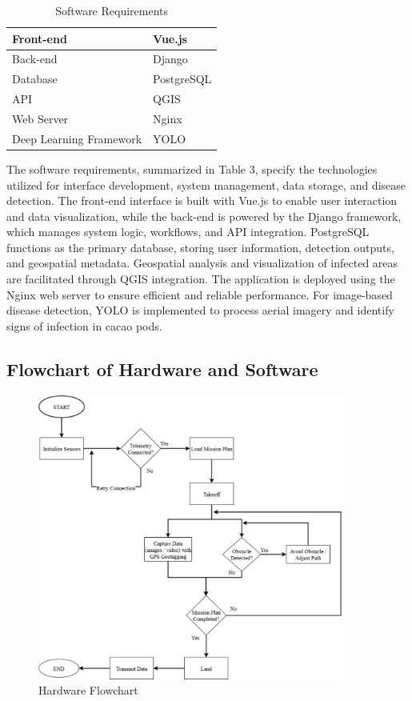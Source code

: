 \begin{table}[H]
	\centering
	\caption{Software Requirements}
	\label{tab:softreq}
	\begin{tabular}{ll}
		\toprule
		Front-end               & Vue.js     \\
		\midrule
		Back-end                & Django     \\
		\midrule
		Database                & PostgreSQL \\
		\midrule
		API                     & QGIS       \\
		\midrule
		Web Server              & Nginx      \\
		\midrule
		Deep Learning Framework & YOLO       \\
		\bottomrule
	\end{tabular}
\end{table}

The software requirements, summarized in Table 3, specify the technologies utilized for interface development, system management, data storage, and disease detection. The front-end interface is built with Vue.js to enable user interaction and data visualization, while the back-end is powered by the Django framework, which manages system logic, workflows, and API integration. PostgreSQL functions as the primary database, storing user information, detection outputs, and geospatial metadata. Geospatial analysis and visualization of infected areas are facilitated through QGIS integration. The application is deployed using the Nginx web server to ensure efficient and reliable performance. For image-based disease detection, YOLO is implemented to process aerial imagery and identify signs of infection in cacao pods.

\subsection{Flowchart of Hardware and Software}

\begin{figure}[H]
	\centering
	\caption{Hardware Flowchart}
	\label{fig:HardFlow}
	\includegraphics[width=0.9\textwidth]{figures/Hard_Flow.pdf}
\end{figure}

